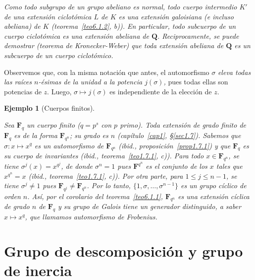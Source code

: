 \documentclass[10pt,oneside,bibtotoc,smallheadings,leqno,a5paper,DIV=12]{scrbook}
\newcommand{\QQ}{\mathbf{Q}}
\newcommand{\FF}{\mathbf{F}}
\numberwithin{equation}{section}
\newenvironment{comm}%
	{\begin{trivlist}\item\small\itshape}
	{\end{trivlist}}
\theoremstyle{defi}
\theoremstyle{enonce}
\theoremstyle{rem}
\newtheorem{example}{Ejemplo}
\numberwithin{theorem}{section}
\numberwithin{proposition}{section}
\numberwithin{definition}{section}
\numberwithin{lemma}{section}
\numberwithin{corollary}{section}
\numberwithin{example}{section}
\numberwithin{footnote}{section}%
\begin{document}
\begin{comm}
Como todo subgrupo de un grupo abeliano es normal, todo cuerpo intermedio $K'$ de
una extensi\'on ciclot\'omica
$L$ de $K$ es una extensi\'on galoisiana (e incluso abeliana) de $K$
(teorema~\ref{teo6.1.2}, {\itshape b})). En particular, todo
subcuerpo de un cuerpo ciclot\'omica es una extensi\'on abeliana de $\QQ$. Reciprocamente,
se puede
demostrar (teorema de Kronecker-Weber) que toda extensi\'on abeliana de $\QQ$ es un
subcuerpo de un cuerpo ciclot\'omico.
\end{comm}

Observemos que, con la misma notaci\'on que antes, el automorfismo $\sigma$ {\em eleva
todas las ra\'ices
$n$-\'esimas de la unidad a la potencia $j(\sigma)$,} pues todas ellas son potencias
de $z$. Luego, $\sigma\mapsto j(\sigma)$ es independiente de la elecci\'on de $z$.

\begin{example}[Cuerpos finitos]\label{ej6.1.3}


Sea $\FF_{q}$ un cuerpo {\em finito} ($q = p^{s}$ con $p$ primo). Toda extensi\'on de grado finito de $\FF_{q}$
es de la forma $\FF_{q^{n}}$; su grado es $n$ (cap\'itulo~\ref{cap1}, \S\ref{sec1.7}). Sabemos que
$\sigma:x\mapsto x^{q}$ es un automorfismo de $\FF_{q^{n}}$ ({\itshape ibid.}, proposici\'on~\ref{prop1.7.1}) y que
$\FF_{q}$ es su cuerpo de invariantes ({\itshape ibid.}, teorema~\ref{teo1.7.1}, {\itshape c})). Para todo $x\in\FF_{q^{n}}$,
se tiene $\sigma^{j}(x) = x^{q^{j}}$, de donde $\sigma^{n}=1$ pues $\FF^{q^{n}}$ es el conjunto de los
$x$ tales que $x^{q^{n}}=x$ ({\itshape ibid.},
teorema~\ref{teo1.7.1}, {\itshape c})). Por otra parte, para
$1\leq j\leq n-1$, se tiene $\sigma^{j}\neq 1$ pues $\FF_{q^{j}}\neq\FF_{q^{n}}$. Por lo tanto,
$\{1,\sigma,\dots,\sigma^{n-1}\}$ es un grupo c\'iclico de orden $n$. As\'i, por el corolario 
del teorema~\ref{teo6.1.1}, $\FF_{q^{n}}$
{\em es una extensi\'on c\'iclica de grado $n$ de $\FF_{q}$ y su grupo de Galois tiene un generador
distinguido, a saber $x\mapsto x^{q}$, que llamamos automorfismo de Frobenius.}
\end{example}

\section{Grupo de descomposici\'on y grupo de inercia}\label{sec6.2}
\end{document}
